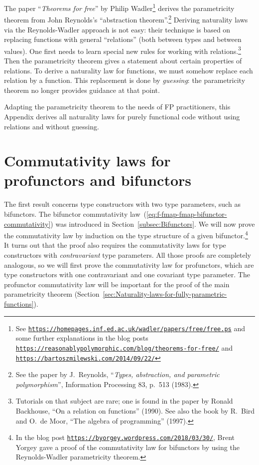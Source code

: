 \noindent {}The paper \textsf{``}\emph{Theorems for free}\textsf{''}
by Philip Wadler\footnote{See \texttt{\href{https://homepages.inf.ed.ac.uk/wadler/papers/free/free.ps}{https://homepages.inf.ed.ac.uk/wadler/papers/free/free.ps}}
and some further explanations in the blog posts \texttt{\href{https://reasonablypolymorphic.com/blog/theorems-for-free/}{https://reasonablypolymorphic.com/blog/theorems-for-free/}}
and \texttt{\href{https://bartoszmilewski.com/2014/09/22/}{https://bartoszmilewski.com/2014/09/22/}}} derives the parametricity theorem from John Reynolds\textsf{'}s \textsf{``}abstraction
theorem\textsf{''}.\footnote{See the paper by J.~Reynolds, \textsf{``}\emph{Types, abstraction, and parametric
polymorphism}\textsf{''}, Information Processing 83, p.~513 (1983).} Deriving naturality laws via the Reynolds-Wadler approach is not
easy: their technique is based on replacing functions with general
\textsf{``}relations\textsf{''} (both between types and between values). One first
needs to learn special new rules for working with relations.\footnote{Tutorials on that subject are rare; one is found in the paper by Ronald
Backhouse, \textsf{``}On a relation on functions\textsf{''} (1990). See also the book
by R.~Bird and O.~de Moor, \textsf{``}The algebra of programming\textsf{''} (1997).} Then the parametricity theorem gives a statement about certain properties
of relations. To derive a naturality law for functions, we must somehow
replace each relation by a function. This replacement is done by \emph{guessing}:
the parametricity theorem no longer provides guidance at that point.

Adapting the parametricity theorem to the needs of FP practitioners,
this Appendix derives all naturality laws for purely functional code
without using relations and without guessing.

\section{Commutativity laws for profunctors and bifunctors\label{sec:Commutativity-laws-for-type-constructors}}

The first result concerns type constructors with two type parameters,
such as bifunctors. The bifunctor commutativity law~(\ref{eq:f-fmap-fmap-bifunctor-commutativity})
was introduced in Section~\ref{subsec:Bifunctors}. We will now prove
the commutativity law by induction on the type structure of a given
bifunctor.\footnote{In the blog post \texttt{\href{https://byorgey.wordpress.com/2018/03/30/}{https://byorgey.wordpress.com/2018/03/30/}},
Brent Yorgey gave a proof of the commutativity
law for bifunctors by using the Reynolds-Wadler parametricity theorem. } It turns out that the proof also requires the commutativity laws
for type constructors with \emph{contravariant} type parameters. All
those proofs are completely analogous, so we will first prove the
commutativity law for profunctors, which are type constructors with
one contravariant and one covariant type parameter. The profunctor
commutativity law will be important for the proof of the main parametricity
theorem (Section~\ref{sec:Naturality-laws-for-fully-parametric-functions}). 


